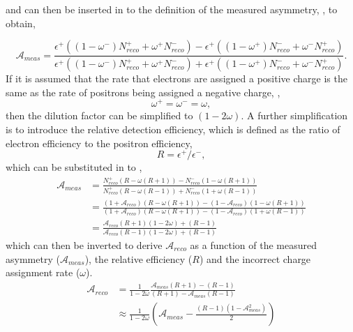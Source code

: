  and  can then be inserted in to the
definition of the measured asymmetry, , to obtain,

\begin{equation}
\label{eq:meas1}
\mathcal{A}_{meas} = \frac{
  \epsilon^+ ( ( 1 - \omega^- ) N_{reco}^{+} + \omega^+ N_{reco}^{-} ) -
  \epsilon^+ ( ( 1 - \omega^+ ) N_{reco}^{-} + \omega^- N_{reco}^{+} )
}
{
  \epsilon^+ ( ( 1 - \omega^- ) N_{reco}^{+} + \omega^+ N_{reco}^{-} ) +
  \epsilon^+ ( ( 1 - \omega^+ ) N_{reco}^{-} + \omega^- N_{reco}^{+} )
} .
\end{equation}
If it is assumed that the rate that
electrons are assigned a positive charge is the same as the rate of positrons
being assigned a negative charge, \ie,
\begin{equation}
  \omega^{+} = \omega^{-} = \omega ,
\end{equation}
then the dilution factor can be simplified to $(1-2\omega)$. A further
simplification is to introduce the relative detection efficiency, which is
defined as the ratio of electron efficiency to the positron efficiency,
\begin{equation}
 R = \epsilon^+/\epsilon^- ,
\end{equation}
which can be substituted in to ,
\begin{align}
\mathcal{A}_{meas} 
&= \frac{
  N_{reco}^{+} (R - \omega(R+1)) -
  N_{reco}^{-} (1 - \omega(R+1))
}
{
  N_{reco}^{+} (R - \omega(R-1)) +
  N_{reco}^{-} (1 + \omega(R-1))
}\\
&= \frac{
  (1+\mathcal{A}_{reco}) (R - \omega(R+1)) -
  (1-\mathcal{A}_{reco}) (1 - \omega(R+1))
}
{
  (1+\mathcal{A}_{reco}) (R - \omega(R+1)) -
  (1-\mathcal{A}_{reco}) (1 + \omega(R-1))
}\\
&= \frac{
  \mathcal{A}_{reco} (R + 1)(1 - 2 \omega) + (R - 1)
}
{
  \mathcal{A}_{reco} (R - 1)(1 - 2 \omega) + (R - 1)
}
\end{align}
which can then be inverted to derive $\mathcal{A}_{reco}$ as a function of the
measured asymmetry ($\mathcal{A}_{meas}$), the relative efficiency ($R$) and the
incorrect charge assignment rate ($\omega$).
\begin{align}
\mathcal{A}_{reco}
&=\frac{1}{1-2\omega}
  \frac{
    \mathcal{A}_{meas} (R + 1) - (R-1)
  }
  {
    (R + 1) - \mathcal{A}_{meas} (R-1)
  }\\
&\approx \frac{1}{1-2\omega}
\left(
  \mathcal{A}_{meas} -
\frac{ (R - 1)(1 - \mathcal{A}_{meas}^{2}) } { 2 }
\right)
\end{align}

